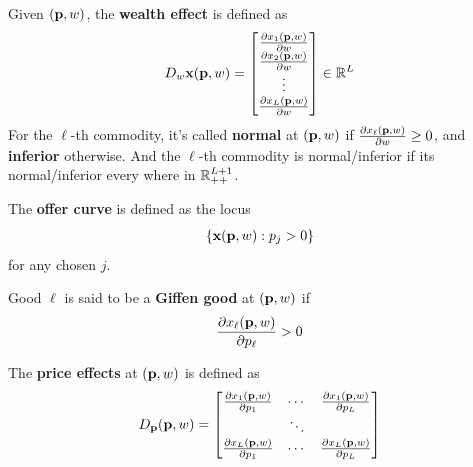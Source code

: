 \documentclass{report}
\begin{document}
 			\begin{definition}
 				Given $(\textbf{p}, w)$, the \textbf{wealth effect} is defined as
 				\begin{equation}
 					D_w \textbf{x}(\textbf{p}, w) 
 					= \begin{bmatrix}
 						\frac{\partial{x_1(\textbf{p}, w)}}{\partial{w}} \\
 						\frac{\partial{x_2(\textbf{p}, w)}}{\partial{w}} \\
 						\vdots \\
 						\frac{\partial{x_L(\textbf{p}, w)}}{\partial{w}}
 					\end{bmatrix} \in \mathbb{R}^L
 				\end{equation}
 				For the $\ell$-th commodity, it's called \textbf{normal} at $(\textbf{p}, w)$ if $\frac{\partial{x_{\ell}(\textbf{p}, w)}}{\partial{w}} \geq 0$, and \textbf{inferior} otherwise. And the $\ell$-th commodity is normal/inferior if its normal/inferior every where in $\mathbb{R}_{++}^{L+1}$. 
 			\end{definition}
 			
 			\begin{definition}
 				The \textbf{offer curve} is defined as the locus
 				\begin{equation}
 					\{\textbf{x}(\textbf{p}, w): p_j > 0\}
 				\end{equation}
 				for any chosen $j$.
 			\end{definition}
 			
 			\begin{definition}
 				Good $\ell$ is said to be a \textbf{Giffen good} at $(\textbf{p}, w)$ if
 				\begin{equation}
 					\frac{\partial{x_\ell(\textbf{p}, w)}}{\partial{p_\ell}} > 0
 				\end{equation}
 			\end{definition}
 			
 			\begin{definition}
 				The \textbf{price effects} at $(\textbf{p}, w)$ is defined as
 				\begin{equation}
 					D_{\textbf{p}} (\textbf{p}, w) = 
 					\begin{bmatrix}
 						\frac{\partial{x_1(\textbf{p}, w)}}{\partial{p_1}} & \cdots & \frac{\partial{x_1(\textbf{p}, w)}}{\partial{p_L}} \\
 						& \ddots & \\
 						\frac{\partial{x_L(\textbf{p}, w)}}{\partial{p_1}} & \cdots & \frac{\partial{x_L(\textbf{p}, w)}}{\partial{p_L}}
 					\end{bmatrix}
 				\end{equation}
 			\end{definition}
 			
\end{document}
